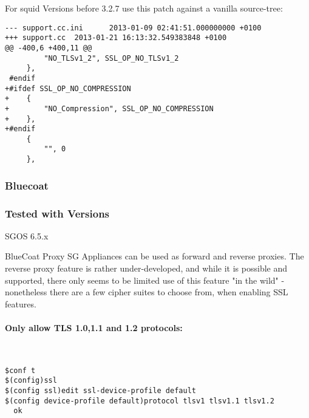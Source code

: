 For squid Versions before 3.2.7 use this patch against a vanilla source-tree:
\begin{lstlisting}
--- support.cc.ini      2013-01-09 02:41:51.000000000 +0100
+++ support.cc  2013-01-21 16:13:32.549383848 +0100
@@ -400,6 +400,11 @@
         "NO_TLSv1_2", SSL_OP_NO_TLSv1_2
     },
 #endif
+#ifdef SSL_OP_NO_COMPRESSION
+    {
+        "NO_Compression", SSL_OP_NO_COMPRESSION
+    },
+#endif
     {
         "", 0
     },
\end{lstlisting}


\subsubsection{Bluecoat}
\subsubsection{Tested with Versions}
\begin{itemize*}
  \item SGOS 6.5.x
\end{itemize*}

BlueCoat Proxy SG Appliances can be used as forward and reverse proxies. The reverse proxy feature is rather under-developed, and while it is possible and supported, there only seems to be limited use of this feature "in the wild" - nonetheless there are a few cipher suites to choose from, when enabling SSL features.

\paragraph*{Only allow TLS 1.0,1.1 and 1.2 protocols:}
~
\begin{lstlisting}
$conf t
$(config)ssl
$(config ssl)edit ssl-device-profile default
$(config device-profile default)protocol tlsv1 tlsv1.1 tlsv1.2
  ok
\end{lstlisting}

